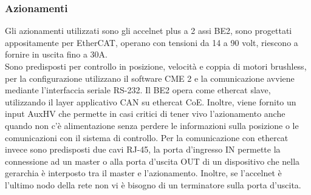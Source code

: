 \subsubsection{Azionamenti}
Gli azionamenti utilizzati sono gli accelnet plus a 2 assi BE2, sono progettati appositamente per EtherCAT, operano con tensioni da 14 a 90 volt, riescono a fornire in uscita fino a 30A.
\\Sono predisposti per controllo in posizione, velocità e coppia di motori brushless, per la configurazione utilizzano il software CME 2 e la comunicazione avviene mediante l'interfaccia seriale RS-232. Il BE2 opera come ethercat slave, utilizzando il layer applicativo CAN su ethercat CoE. Inoltre, viene fornito un input AuxHV che permette in casi critici di tener vivo l'azionamento anche quando non c'è alimentazione senza perdere le informazioni sulla posizione o le comunicazioni con il sistema di controllo.
Per la comunicazione con ethercat invece sono predisposti due cavi RJ-45, la porta d'ingresso IN permette la connessione ad un master o alla porta d'uscita OUT di un dispositivo che nella gerarchia è interposto tra il master e l'azionamento. Inoltre, se l'accelnet è l'ultimo nodo della rete non vi è bisogno di un terminatore sulla porta d'uscita.
 
